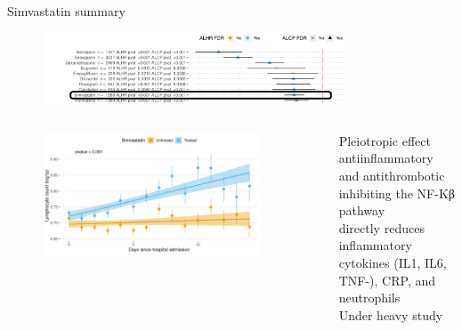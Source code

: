 \documentclass[compress,ignorenonframetext,aspectratio=1610,handout]{beamer}
\begin{document}
\begin{frame}{Simvastatin summary}

	\begin{figure}
		\includegraphics[width=0.8\textwidth]{figs/results/simvastatin_summary_.png}	
	\end{figure}
		
	\begin{columns}
			
		\begin{figure}
			\includegraphics[width=0.9\textwidth]{figs/results/db00641_simvastatin_lymphocite_progression.pdf}	
		\end{figure}

		Pleiotropic effect\\
		antiinflammatory and antithrombotic\\
		inhibiting the NF-Kβ pathway\\
		directly reduces inflammatory cytokines (IL1, IL6, TNF-\textalpha), CRP, and neutrophils\\
		Under heavy study

	\end{columns}

\end{frame}
\end{document}
